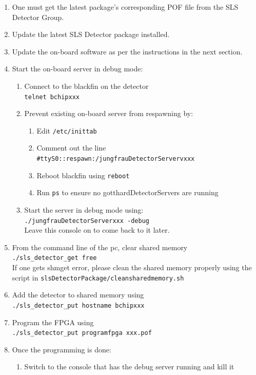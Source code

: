 \documentclass{article}
\begin{document}
\begin{enumerate}
  \item One must get the latest package's corresponding POF file from the SLS
Detector Group.
  \item Update the latest SLS Detector package installed.
  \item Update the on-board software as per the instructions in the next
section.
  \item Start the on-board server in debug mode:
  \begin{enumerate}
    \item Connect to the blackfin on the detector\\ 
\verb=telnet bchipxxx=
    \item Prevent existing on-board server from respawning by:
    \begin{enumerate}
      \item Edit \verb=/etc/inittab= 
      \item Comment out the line
\verb=#ttyS0::respawn:/jungfrauDetectorServervxxx= 
      \item Reboot blackfin using \verb=reboot=
      \item Run \verb=ps= to ensure no gotthardDetectorServers are running
    \end{enumerate}
    \item Start the server in debug mode using: \\
\verb=./jungfrauDetectorServerxxx -debug= \\
    Leave this console on to come back to it later.
  \end{enumerate}
  \item From the command line of the pc, clear shared memory \\
\verb=./sls_detector_get free= \\
  If one gets shmget error, please clean the shared memory properly using the
script in \verb=slsDetectorPackage/cleansharedmemory.sh=
  \item Add the detector to shared memory using \\
\verb=./sls_detector_put hostname bchipxxx=
  \item Program the FPGA using \\
\verb=./sls_detector_put programfpga xxx.pof= 
  \item Once the programming is done:
  \begin{enumerate}
    \item Switch to the console that has the debug server running and kill it

\end{enumerate}
\end{enumerate}
\end{document}
